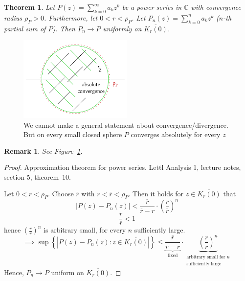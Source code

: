 \documentclass{article}
\newtheorem{theorem}{Theorem}  \numberwithin{theorem}{section}
\newtheorem{remark}{Remark}  \numberwithin{remark}{section}
\newcommand{\set}[1]{\left\{#1\right\}}
\newcommand{\card}[1]{\left|#1\right|}
\begin{document}
\begin{theorem} %
  Let $P(z) = \sum_{k=0}^\infty a_k z^k$ be a power series in $\mathbb C$ with convergence radius $\rho_P > 0$.
  Furthermore, let $0 < r < \rho_P$.
  Let $P_n(z) = \sum_{k=0}^n a_k z^k$ ($n$-th partial sum of $P$).
  Then $P_n \to P$ uniformly on $\overline{K_r(0)}$.
\end{theorem}

\begin{figure}[t]
  \begin{center}
    \includegraphics[width=0.5\textwidth]{img/26_uniform_convergence.pdf}
    \caption{We cannot make a general statement about convergence/divergence. But on every small closed sphere $P$ converges absolutely for every $z$}
    \label{img:uconv}
  \end{center}
\end{figure}

\begin{remark}
  See Figure~\ref{img:uconv}.
\end{remark}

\begin{proof}
  Approximation theorem for power series.
  Lettl Analysis 1, lecture notes, section 5, theorem~10.

  Let $0 < r < \rho_P$. Choose $\overline{r}$ with $r < \overline{r} < \rho_P$.
  Then it holds for $z \in \overline{K_r(0)}$ that
  \[ \card{P(z) - P_n(z)} < \frac{\overline{r}}{\overline{r} - r} \cdot \left(\frac{r}{\overline{r}}\right)^n \]
  \[ \frac{r}{\overline{r}} < 1 \]
  hence $\left(\frac{r}{\overline{r}}\right)^n$ is arbitrary small, for every $n$ sufficiently large.
  \[ \implies \sup\set{\card{P(z) - P_n(z): z \in \overline{K_r(0)}}} \leq \underbrace{\frac{\overline r}{\overline r - r}}_{\text{fixed}} \cdot \underbrace{\left(\frac{r}{\overline{r}}\right)^n}_{\substack{\text{arbitrary small for $n$} \\ \text{sufficiently large}}} \]
  Hence, $P_n \to P$ uniform on $\overline{K_r(0)}$.
\end{proof}
\end{document}
